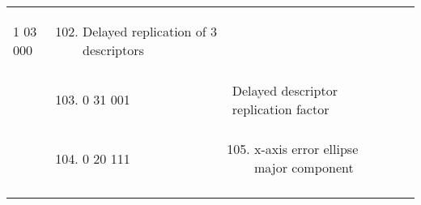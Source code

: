 \begin{longtable}[]{@{}llll@{}}
\begin{minipage}[t]{0.22\columnwidth}
\begin{enumerate}
  1 03 000
\end{enumerate}\strut
\end{minipage} & \begin{minipage}[t]{0.22\columnwidth}\raggedright
\begin{enumerate}
\setcounter{enumi}{101}
\item
  Delayed replication of 3 descriptors
\end{enumerate}\strut
\end{minipage} & \begin{minipage}[t]{0.22\columnwidth}\raggedright
\strut
\end{minipage}\tabularnewline
\begin{minipage}[t]{0.22\columnwidth}\raggedright
\strut
\end{minipage} & \begin{minipage}[t]{0.22\columnwidth}\raggedright
\begin{enumerate}
\setcounter{enumi}{102}
\item
  0 31 001
\end{enumerate}\strut
\end{minipage} & \begin{minipage}[t]{0.22\columnwidth}\raggedright
Delayed descriptor replication factor\strut
\end{minipage} & \begin{minipage}[t]{0.22\columnwidth}\raggedright
\strut
\end{minipage}\tabularnewline
\begin{minipage}[t]{0.22\columnwidth}\raggedright
\strut
\end{minipage} & \begin{minipage}[t]{0.22\columnwidth}\raggedright
\begin{enumerate}
\setcounter{enumi}{103}
\item
  0 20 111
\end{enumerate}\strut
\end{minipage} & \begin{minipage}[t]{0.22\columnwidth}\raggedright
\begin{enumerate}
\setcounter{enumi}{104}
\item
  x-axis error ellipse major component
\end{enumerate}\strut
\end{minipage} & \begin{minipage}[t]{0.22\columnwidth}\raggedright
\strut
\end{minipage}\tabularnewline
\begin{minipage}[t]{0.22\columnwidth}\raggedright

\end{minipage}
\end{longtable}
